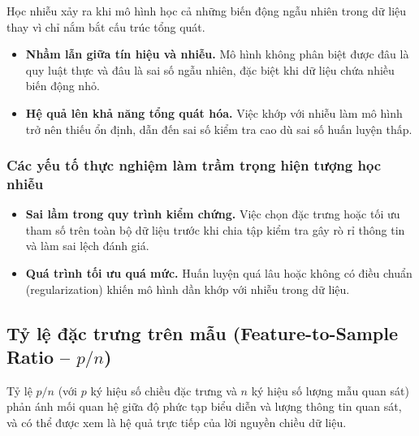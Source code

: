 Học nhiễu xảy ra khi mô hình học cả những biến động ngẫu nhiên trong dữ liệu thay vì chỉ nắm bắt cấu trúc tổng quát\cite{Ying2019}.

\begin{itemize}
    \item \textbf{Nhầm lẫn giữa tín hiệu và nhiễu.} Mô hình không phân biệt được đâu là quy luật thực và đâu là sai số ngẫu nhiên, đặc biệt khi dữ liệu chứa nhiều biến động nhỏ.
    
    \item \textbf{Hệ quả lên khả năng tổng quát hóa.} Việc khớp với nhiễu làm mô hình trở nên thiếu ổn định, dẫn đến sai số kiểm tra cao dù sai số huấn luyện thấp. \cite[p.~221]{Hastie2009}
\end{itemize}

\subsubsection{Các yếu tố thực nghiệm làm trầm trọng hiện tượng học nhiễu}

\begin{itemize}
    \item \textbf{Sai lầm trong quy trình kiểm chứng.} Việc chọn đặc trưng hoặc tối ưu tham số trên toàn bộ dữ liệu trước khi chia tập kiểm tra gây rò rỉ thông tin và làm sai lệch đánh giá\cite[p.~245]{Hastie2009}.
    
    \item \textbf{Quá trình tối ưu quá mức.} Huấn luyện quá lâu hoặc không có điều chuẩn (regularization) khiến mô hình dần khớp với nhiễu trong dữ liệu.
\end{itemize}


\subsection{Tỷ lệ đặc trưng trên mẫu (Feature-to-Sample Ratio -- $p/n$)}

Tỷ lệ $p/n$ (với $p$ ký hiệu số chiều đặc trưng và $n$ ký hiệu số lượng mẫu quan sát) phản ánh mối quan hệ giữa độ phức tạp biểu diễn và lượng thông tin quan sát, và có thể được xem là hệ quả trực tiếp của lời nguyền chiều dữ liệu.

